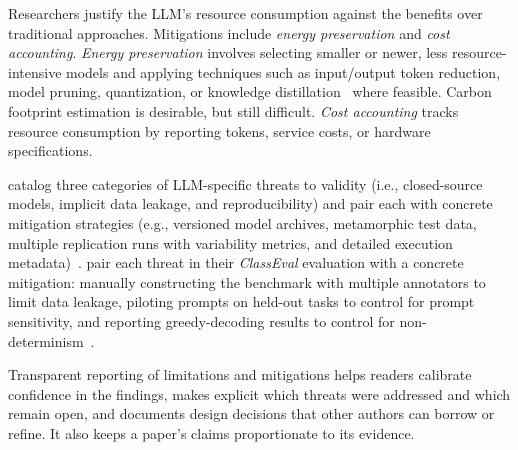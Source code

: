 Researchers \should justify the LLM's resource consumption against the benefits over traditional approaches.
Mitigations include \emph{energy preservation} and \emph{cost accounting}. \emph{Energy preservation} involves selecting smaller or newer, less resource-intensive models and applying techniques such as input/output token reduction, model pruning, quantization, or knowledge distillation~\cite{mitu2024hidden} where feasible. Carbon footprint estimation is desirable, but still difficult. \emph{Cost accounting} tracks resource consumption by reporting tokens, service costs, or hardware specifications.


\citeauthor{DBLP:conf/icse/SallouDP24} catalog three categories of LLM-specific threats to validity (i.e., closed-source models, implicit data leakage, and reproducibility) and pair each with concrete mitigation strategies (e.g., versioned model archives, metamorphic test data, multiple replication runs with variability metrics, and detailed execution metadata)~\cite{DBLP:conf/icse/SallouDP24}.
\citeauthor{DBLP:conf/icse/Du0WWL0FS0L24} pair each threat in their \emph{ClassEval} evaluation with a concrete mitigation: manually constructing the benchmark with multiple annotators to limit data leakage, piloting prompts on held-out tasks to control for prompt sensitivity, and reporting greedy-decoding results to control for non-determinism~\cite{DBLP:conf/icse/Du0WWL0FS0L24}.


Transparent reporting of limitations and mitigations helps readers calibrate confidence in the findings, makes explicit which threats were addressed and which remain open, and documents design decisions that other authors can borrow or refine. It also keeps a paper's claims proportionate to its evidence.

